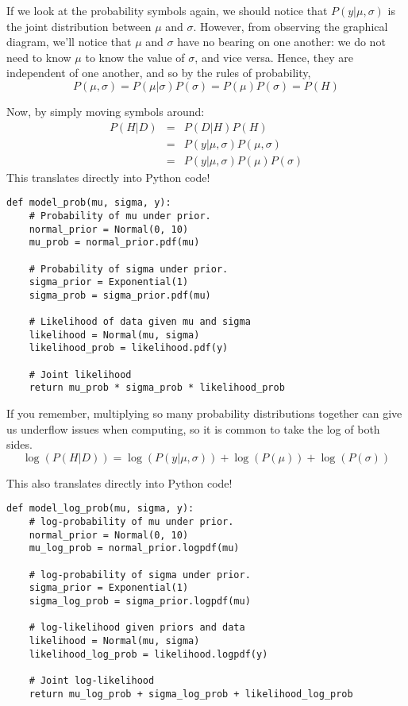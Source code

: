 If we look at the probability symbols again, we should notice that $P(y|\mu,\sigma)$ is the joint distribution between $\mu$ and $\sigma$. However, from observing the graphical diagram, we'll notice that $\mu$ and $\sigma$ have no bearing on one another: we do not need to know $\mu$ to know the value of $\sigma$, and vice versa. Hence, they are independent of one another, and so by the rules of probability,
\begin{equation}
P(\mu ,\sigma )=P(\mu |\sigma )P(\sigma )=P(\mu )P(\sigma )=P(H)
\end{equation}

Now, by simply moving symbols around:
\begin{eqnarray}
P(H|D)&=&P(D|H)P(H)\\
&=&P(y|\mu ,\sigma )P(\mu ,\sigma )\\
&=&P(y|\mu ,\sigma )P(\mu )P(\sigma )
\end{eqnarray}
This translates directly into Python code!
\begin{lstlisting}
def model_prob(mu, sigma, y):
    # Probability of mu under prior.
    normal_prior = Normal(0, 10)
    mu_prob = normal_prior.pdf(mu)

    # Probability of sigma under prior.
    sigma_prior = Exponential(1)
    sigma_prob = sigma_prior.pdf(mu)

    # Likelihood of data given mu and sigma
    likelihood = Normal(mu, sigma)
    likelihood_prob = likelihood.pdf(y)

    # Joint likelihood
    return mu_prob * sigma_prob * likelihood_prob
\end{lstlisting}

If you remember, multiplying so many probability distributions together can give us underflow issues when computing, so it is common to take the log of both sides.
\begin{equation}
\log(P(H|D))=\log(P(y|\mu ,\sigma ))+\log(P(\mu ))+\log(P(\sigma ))
\end{equation}

This also translates directly into Python code!

\begin{lstlisting}
def model_log_prob(mu, sigma, y):
    # log-probability of mu under prior.
    normal_prior = Normal(0, 10)
    mu_log_prob = normal_prior.logpdf(mu)

    # log-probability of sigma under prior.
    sigma_prior = Exponential(1)
    sigma_log_prob = sigma_prior.logpdf(mu)

    # log-likelihood given priors and data
    likelihood = Normal(mu, sigma)
    likelihood_log_prob = likelihood.logpdf(y)

    # Joint log-likelihood
    return mu_log_prob + sigma_log_prob + likelihood_log_prob
\end{lstlisting}

